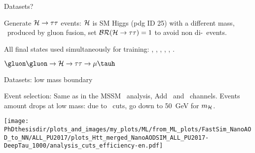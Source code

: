 \begin{frame}{Datasets?}

\begin{minipage}[c]{.49\textwidth}
\manip Generate $\mathcal{H}\to\tau\tau$ events:
\submanip $\mathcal{H}$ is SM Higgs (pdg ID 25) with a different mass,
\submanip \higgsML\ produced by gluon fusion,
\submanip set $\mathcal{BR}(\mathcal{H}\to\tau\tau)=1$ to avoid non di-\tau\ events.

\manip All final states used simultaneously for training:
\submanip \tauh\tauh, \mu\tauh, \ele\tauh, \mu\mu, \ele\mu, \ele\ele.
\end{minipage}
\hfill
\begin{minipage}[c]{.48\textwidth}
\def\Higgs{\higgsML}
\begin{block}{$\gluon\gluon\to\Higgs\to\tau\tau\to\mu\tauh$}
\begin{center}

\vspace{2\baselineskip}



\vspace{2\baselineskip}

\end{center}
\end{block}
\end{minipage}
\end{frame}

\begin{frame}{Datasets: low mass boundary}

\begin{minipage}[c]{.45\textwidth}
\manip Event selection:
\submanip Same as in the MSSM \HAtoTauTau\ analysis,
\submanip Add \mu\mu\ and \ele\ele\ channels.
\manip Events amount drops at low mass:
\submanip due to \pT\ cuts,
\submanip go down to \SI{50}{\GeV} for $m_{\mathcal{H}}$.
\end{minipage}
\hfill
\begin{minipage}[c]{.45\textwidth}
\begin{center}
\texttt{[image: \\PhDthesisdir/plots\_and\_images/my\_plots/ML/from\_ML\_plots/FastSim\_NanoAOD\_to\_NN/ALL\_PU2017/plots\_Htt\_merged\_NanoAODSIM\_ALL\_PU2017-DeepTau\_1000/analysis\_cuts\_efficiency-en.pdf]}
\end{center}
\end{minipage}

\end{frame}


